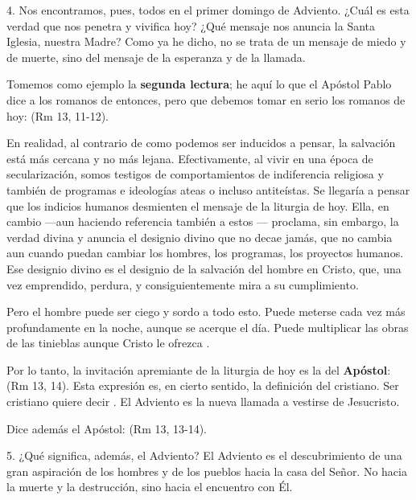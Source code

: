 \begin{body}
	4. Nos encontramos, pues, todos en el primer domingo de Adviento. ¿Cuál es esta verdad que nos penetra y vivifica hoy? ¿Qué mensaje nos anuncia la Santa Iglesia, nuestra Madre? Como ya he dicho, no se trata de un mensaje de miedo y de muerte, sino del mensaje de la esperanza y de la llamada. 
	
	Tomemos como ejemplo la \textbf{segunda lectura}; he aquí lo que el Apóstol Pablo dice a los romanos de entonces, pero que debemos tomar en serio los romanos de hoy:  (Rm 13, 11-12). 
	
	En realidad, al contrario de como podemos ser inducidos a pensar, la salvación está más cercana y no más lejana. Efectivamente, al vivir en una época de secularización, somos testigos de comportamientos de indiferencia religiosa y también de programas e ideologías ateas o incluso antiteístas. Se llegaría a pensar que los indicios humanos desmienten el mensaje de la liturgia de hoy. Ella, en cambio ---aun haciendo referencia también a estos --- proclama, sin embargo, la verdad divina y anuncia el designio divino que no decae jamás, que no cambia aun cuando puedan cambiar los hombres, los programas, los proyectos humanos. Ese designio divino es el designio de la salvación del hombre en Cristo, que, una vez emprendido, perdura, y consiguientemente mira a su cumplimiento. 
	
	Pero el hombre puede ser ciego y sordo a todo esto. Puede meterse cada vez más profundamente en la noche, aunque se acerque el día. Puede multiplicar las obras de las tinieblas aunque Cristo le ofrezca . 
	
	Por lo tanto, la invitación apremiante de la liturgia de hoy es la del \textbf{Apóstol}:  (Rm 13, 14). Esta expresión es, en cierto sentido, la definición del cristiano. Ser cristiano quiere decir . El Adviento es la nueva llamada a vestirse de Jesucristo. 
	
	Dice además el Apóstol:  (Rm 13, 13-14). 
	
	5. ¿Qué significa, además, el Adviento? El Adviento es el descubrimiento de una gran aspiración de los hombres y de los pueblos hacia la casa del Señor. No hacia la muerte y la destrucción, sino hacia el encuentro con Él. 
	

\end{body}
